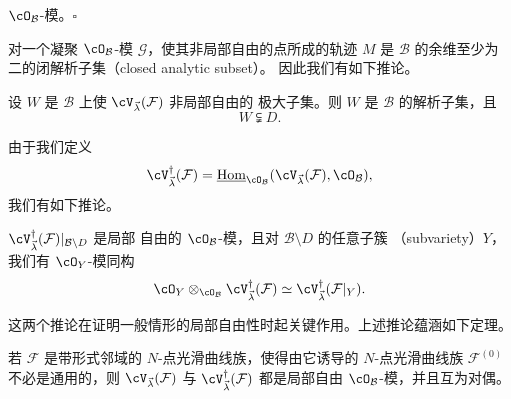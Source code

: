 $\cO_\mathcal{B}$-模。\hfill$\square$

对一个凝聚 $\cO_\mathcal{B}$-模 $\mathcal{G}$，使其非局部自由的点所成的轨迹
$M$ 是 $\mathcal{B}$ 的余维至少为二的闭解析子集（closed analytic subset）。
因此我们有如下推论。

\begin{corollary}[4.9]
设 $W$ 是 $\mathcal{B}$ 上使 $\cV_{\vec{\lambda}}(\mathcal{F})$ 非局部自由的
极大子集。则 $W$ 是 $\mathcal{B}$ 的解析子集，且
\[
  W\subsetneqq D .
\]
\end{corollary}

由于我们定义
\[
  \cV_{\vec{\lambda}}^\dagger(\mathcal{F})
  =\underline{\operatorname{Hom}}_{\cO_\mathcal{B}}
  (\cV_{\vec{\lambda}}(\mathcal{F}),\cO_\mathcal{B}),
\]
我们有如下推论。

\begin{corollary}[4.10]
$\cV_{\vec{\lambda}}^\dagger(\mathcal{F})|_{\mathcal{B}\setminus D}$ 是局部
自由的 $\cO_\mathcal{B}$-模，且对 $\mathcal{B}\setminus D$ 的任意子簇
（subvariety）$Y$，我们有 $\cO_Y$-模同构
\[
  \cO_Y\otimes_{\cO_\mathcal{B}}\cV_{\vec{\lambda}}^\dagger(\mathcal{F})
  \simeq\cV_{\vec{\lambda}}^\dagger(\mathcal{F}|_Y) .
\]
\end{corollary}

这两个推论在证明一般情形的局部自由性时起关键作用。上述推论蕴涵如下定理。

\begin{theorem}[4.11]
若 $\mathcal{F}$ 是带形式邻域的 $N$-点光滑曲线族，使得由它诱导的
$N$-点光滑曲线族 $\mathcal{F}^{(0)}$ 不必是通用的，则
$\cV_{\vec{\lambda}}(\mathcal{F})$ 与
$\cV_{\vec{\lambda}}^\dagger(\mathcal{F})$ 都是局部自由
$\cO_\mathcal{B}$-模，并且互为对偶。
\end{theorem}

